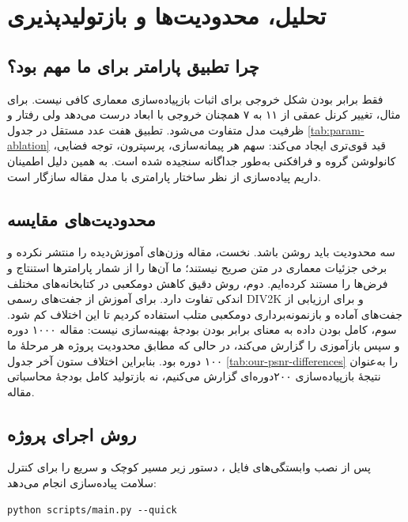 \chapter{تحلیل، محدودیت‌ها و بازتولیدپذیری}

\section{چرا تطبیق پارامتر برای ما مهم بود؟}

فقط برابر بودن شکل خروجی برای اثبات بازپیاده‌سازی معماری کافی نیست. برای مثال، تغییر کرنل عمقی از ۱۱ به ۷ همچنان خروجی با ابعاد درست می‌دهد ولی رفتار و ظرفیت مدل متفاوت می‌شود. تطبیق هفت عدد مستقل در جدول \ref{tab:param-ablation} قید قوی‌تری ایجاد می‌کند: سهم هر پیمانه‌سازی، پرسپترون، توجه فضایی، کانولوشن گروه و فرافکنی به‌طور جداگانه سنجیده شده است. به همین دلیل اطمینان داریم پیاده‌سازی از نظر ساختار پارامتری با مدل مقاله سازگار است.

\section{محدودیت‌های مقایسه}

سه محدودیت باید روشن باشد. نخست، مقاله وزن‌های آموزش‌دیده را منتشر نکرده و برخی جزئیات معماری در متن صریح نیستند؛ ما آن‌ها را از شمار پارامترها استنتاج و فرض‌ها را مستند کرده‌ایم. دوم، روش دقیق کاهش دو‌مکعبی در کتابخانه‌های مختلف اندکی تفاوت دارد. برای آموزش از جفت‌های رسمی DIV2K و برای ارزیابی از جفت‌های آماده و بازنمونه‌برداری دو‌مکعبی متلب استفاده کردیم تا این اختلاف کم شود. سوم، کامل بودن داده به معنای برابر بودن بودجهٔ بهینه‌سازی نیست: مقاله ۱۰۰۰ دوره و سپس بازآموزی را گزارش می‌کند، در حالی که مطابق محدودیت پروژه هر مرحلهٔ ما ۱۰۰ دوره بود. بنابراین اختلاف ستون آخر جدول \ref{tab:our-psnr-differences} را به‌عنوان نتیجهٔ بازپیاده‌سازی ۲۰۰‌دوره‌ای گزارش می‌کنیم، نه بازتولید کامل بودجهٔ محاسباتی مقاله.

\section{روش اجرای پروژه}

پس از نصب وابستگی‌های فایل ، دستور زیر مسیر کوچک و سریع را برای کنترل سلامت پیاده‌سازی انجام می‌دهد:

\begin{latin}
\begin{verbatim}
python scripts/main.py --quick
\end{verbatim}
\end{latin}

